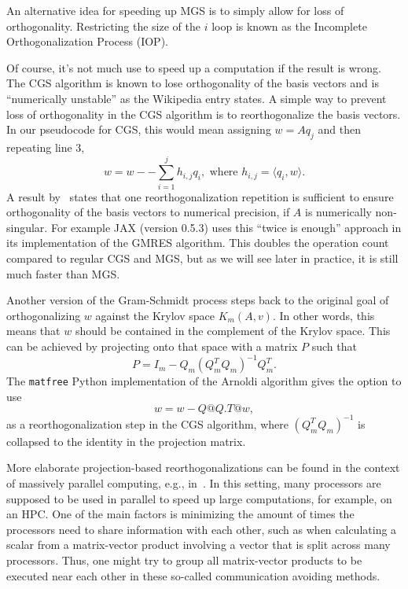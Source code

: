 \documentclass[11pt]{article}
\begin{document}
An alternative idea for speeding up MGS is to simply allow for loss of orthogonality.
Restricting the size of the $i$ loop is known as the Incomplete Orthogonalization Process (IOP).

Of course, it's not much use to speed up a computation if the result is wrong.
The CGS algorithm is known to lose orthogonality of the basis vectors and is ``numerically unstable'' as the Wikipedia entry states.
A simple way to prevent loss of orthogonality in the CGS algorithm is to reorthogonalize the basis vectors.
In our pseudocode for CGS, this would mean assigning $w = Aq_j$ and then repeating line 3,
\[w = w - - \sum_{i=1}^j h_{i, j} q_i, \text{ where }h_{i,j} = \langle q_i, w \rangle.\]
A result by~\cite{giraudRoundingErrorAnalysis2005} states that one reorthogonalization repetition is sufficient to ensure orthogonality of the basis vectors to numerical precision, if $A$ is numerically non-singular.
For example JAX (version 0.5.3) uses this ``twice is enough'' approach in its implementation of the GMRES algorithm.
This doubles the operation count compared to regular CGS and MGS, but as we will see later in practice, it is still much faster than MGS\@.

Another version of the Gram-Schmidt process steps back to the original goal of orthogonalizing $w$ against the Krylov space $K_m(A,v)$.
In other words, this means that $w$ should be contained in the complement of the Krylov space.
This can be achieved by projecting onto that space with a matrix $P$ such that
\[
  P = I_m - Q_m (Q_m^T Q_m)^{-1} Q_m^T.
\]
The \verb|matfree| Python implementation of the Arnoldi algorithm gives the option to use
\[
    w = w - Q @ Q.T @ w,
\]
as a reorthogonalization step in the CGS algorithm, where $(Q_m^T Q_m)^{-1}$ is collapsed to the identity in the projection matrix.

More elaborate projection-based reorthogonalizations can be found in the context of massively parallel computing, e.g., in~\cite{tafollaLowsynchronizationArnoldiMethods2024}.
In this setting, many processors are supposed to be used in parallel to speed up large computations, for example, on an HPC\@.
One of the main factors is minimizing the amount of times the processors need to share information with each other, such as when calculating a scalar from a matrix-vector product involving a vector that is split across many processors.
Thus, one might try to group all matrix-vector products to be executed near each other in these so-called communication avoiding methods.
\end{document}
